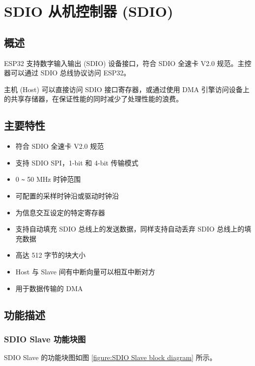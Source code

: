 \documentclass[main\_\_CN.tex]{subfiles}
\begin{document}
\setchineseformatting


\ifglobal
\else
    \listoftodos
    {\let\clearpage\relax \listofdonetodos}
    \tableofcontents
\fi



\hypertarget{sdioslave}{}
\chapter{SDIO 从机控制器 (SDIO)}
\label{mod:sdioslave}


\section{概述}
ESP32 支持数字输入输出 (SDIO) 设备接口，符合 SDIO 全速卡 V2.0 规范。主控器可以通过 SDIO 总线协议访问 ESP32。

主机 (Host) 可以直接访问 SDIO 接口寄存器，或通过使用 DMA 引擎访问设备上的共享存储器，在保证性能的同时减少了处理性能的浪费。

 \section{主要特性}
 \begin{itemize}
 \item 符合 SDIO 全速卡 V2.0 规范
    \item 支持 SDIO SPI，1-bit 和 4-bit 传输模式
    \item 0 \verb+~+ 50 MHz 时钟范围
    \item 可配置的采样时钟沿或驱动时钟沿
    \item 为信息交互设定的特定寄存器
    \item 支持自动填充 SDIO 总线上的发送数据，同样支持自动丢弃 SDIO 总线上的填充数据
    \item 高达 512 字节的块大小
    \item Host 与 Slave 间有中断向量可以相互中断对方
    \item 用于数据传输的 DMA
\end{itemize}
\section{功能描述}
\subsection{SDIO Slave 功能块图}
SDIO Slave 的功能块图如图 \ref{figure:SDIO Slave block diagram} 所示。
\end{document}
